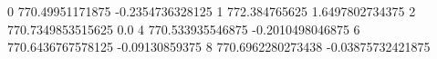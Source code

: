 0 770.49951171875 -0.2354736328125
1 772.384765625 1.6497802734375
2 770.7349853515625 0.0
4 770.533935546875 -0.2010498046875
6 770.6436767578125 -0.09130859375
8 770.6962280273438 -0.03875732421875
